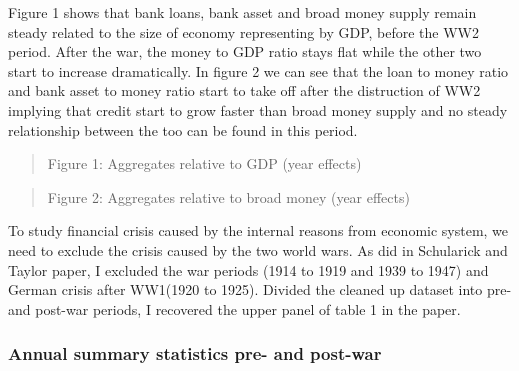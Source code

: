 \documentclass{article}
\newcommand{\ciapdf}[1]{\vspace*{-\parskip}\begin{center}\resizebox{0.75\textwidth}{!}{\texttt{[image: \#1]}}\end{center}}
\begin{document}
Figure 1 shows that bank loans, bank asset and broad money supply remain
steady related to the size of economy representing by GDP,
before the WW2 period. After the war, the money to GDP ratio stays flat
while the other two start to increase dramatically. In figure 2 we
can see that the loan to money ratio and bank asset to money ratio start
to take off after the distruction of WW2 implying that credit start to
grow faster than broad money supply and no steady relationship between
the too can be found in this period.

\ciapdf{Figure_2.pdf}

\begin{quote}
Figure 1: Aggregates relative to GDP (year effects)
\end{quote}

\ciapdf{Figure_1.pdf}

\begin{quote}
Figure 2: Aggregates relative to broad money (year effects)
\end{quote}

To study financial crisis caused by the internal reasons from economic system,
we need to
exclude the crisis caused by the two world wars. As did in Schularick and
Taylor paper, I excluded the war periods (1914 to 1919 and 1939 to 1947)
and German crisis after WW1(1920 to 1925). Divided the cleaned up
dataset into pre- and post-war periods, I recovered the upper panel of
table 1 in the paper.

\subsubsection*{\centering{}Annual summary statistics pre- and post-war}
\end{document}

